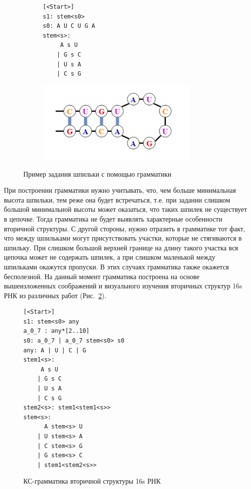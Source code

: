 \documentclass[14pt]{matmex-diploma}
\begin{document}
\begin{figure}[!ht]
    \centering
    \begin{subfigure}[b]{0.4\textwidth}
\begin{verbatim}
[<Start>] 
s1: stem<s0> 
s0: A U C U G A 
stem<s>: 
     A s U 
    | G s C 
    | U s A 
    | C s G
\end{verbatim}
    \end{subfigure}
\begin{subfigure}[b]{0.4\textwidth}
        \includegraphics[width=8cm]{grammar.png}
    \end{subfigure}
\caption{Пример задания шпильки с помощью грамматики}
\label{3}
\end{figure}


При построении грамматики нужно учитывать, что, чем больше минимальная высота шпильки, тем реже она будет встречаться, т.е. при задании слишком большой минимальной высоты может оказаться, что таких шпилек не существует в цепочке. Тогда грамматика не будет выявлять характерные особенности вторичной структуры. С другой стороны, нужно отразить в грамматике тот факт, что между шпильками могут присутствовать участки, которые не стягиваются в шпильку. При слишком большой верхней границе на длину такого участка вся цепочка может не содержать шпилек, а при слишком маленькой между шпильками окажутся пропуски. В этих случаях грамматика также окажется бесполезной. На данный момент грамматика построена на основе вышеизложенных соображений и визуального изучения вторичных структур 16s РНК из различных работ (Рис.~\ref{4}).



\hfill
\begin{figure}[ht!]
\begin{center}
\begin{verbatim}
[<Start>]
s1: stem<s0> any
a_0_7 : any*[2..10]
s0: a_0_7 | a_0_7 stem<s0> s0
any: A | U | C | G
stem1<s>: 
     A s U 
    | G s C 
    | U s A 
    | C s G
stem2<s>: stem1<stem1<s>>
stem<s>: 
      A stem<s> U
    | U stem<s> A
    | C stem<s> G
    | G stem<s> C
    | stem1<stem2<s>>
\end{verbatim}
\caption{КС-грамматика вторичной структуры 16s РНК}
\label{4}
\end{center}
\end{figure}
\end{document}
